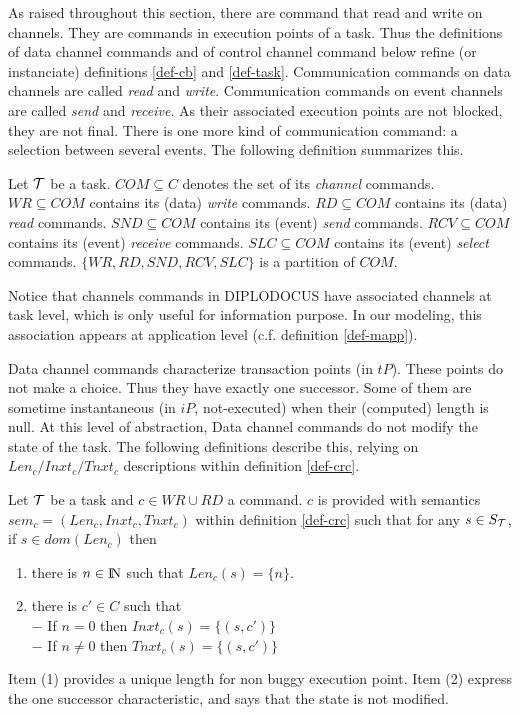 \documentclass{article}
\newcommand{\NAT}{\mbox{\normalfont I$\!$N}}
\begin{document}
As raised throughout this section, there are command that read and write on channels. They are commands in execution points of a task. Thus the definitions of data channel commands and of control channel command below refine (or instanciate) definitions \ref{def-cb} and \ref{def-task}. Communication commands on data channels are called {\em read} and {\em write}. Communication commands on event channels are called {\em send} and {\em receive}. As their associated execution points are not blocked, they are not final. There is one more kind of communication command: a selection between several events. The following definition summarizes this.
\begin{definition}\label{def-chcmd} Let ${\cal T}$ be a task. $COM\subseteq C$ denotes the set of its {\em channel} commands. $W\!R\subseteq COM$ contains its (data) {\em write} commands. $RD\subseteq COM$ contains its (data) {\em read} commands. $S\!N\!D\subseteq COM$ contains its (event) {\em send} commands. $RCV\subseteq COM$ contains its (event) {\em receive} commands. $SLC\subseteq COM$ contains its (event) {\em select} commands. $\{W\!R,RD,S\!N\!D,RCV,S\!LC\}$ is a partition of $COM$.
\end{definition}
Notice that channels commands in DIPLODOCUS have associated channels at task level, which is only useful for information purpose. In our modeling, this association appears at application level (c.f. definition \ref{def-mapp}).
 
Data channel commands characterize transaction points (in $tP$). These points do not make a choice. Thus they have exactly one successor. Some of them are sometime instantaneous (in $iP$, not-executed) when their (computed) length is null. At this level of abstraction, Data channel commands do not modify the state of the task. The following definitions describe this, relying on $Len_c/Inxt_c/Tnxt_c$ descriptions within definition \ref{def-crc}.
\begin{definition}\label{def-dccmd} Let ${\cal T}$ be a task and $c\in W\!R\cup RD$ a command. $c$ is provided with semantics $sem_c=(Len_c,Inxt_c,Tnxt_c)$ within definition \ref{def-crc} such that for any $s\in S_{\cal T}$, if $s\in dom(Len_c)$ then
\begin{enumerate}
\item  there is $n\in\NAT$ such that $Len_c(s)=\{n\}$.
\item  there is $c'\in C$ such that\\
      $-$ If $n= 0$ then $Inxt_c(s)=\{(s,c')\}$\\
      $-$ If $n\neq 0$ then $Tnxt_c(s)=\{(s,c')\}$
\end{enumerate}
\end{definition}
Item (1) provides a unique length for non buggy execution point. Item (2) express the one successor characteristic, and says that the state is not modified.
\end{document}
